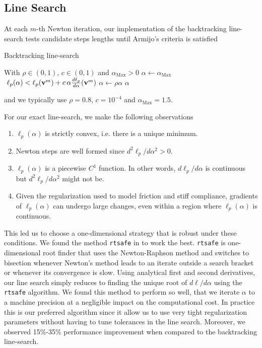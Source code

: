 \subsection{Line Search}
At each $m\text{-th}$ Newton iteration, our implementation of the backtracking
line-search tests candidate steps lengths until Armijo's criteria \cite[\S
3.1]{bib:nocedal2006numerical} is satisfied
\begin{algorithm}[H]
	\caption{Backtracking line-search}	
	\begin{algorithmic}
	\State With $\rho \in (0, 1)$, $c \in (0, 1)$ and $\alpha_\text{Max}>0$
	\State $\alpha\gets \alpha_\text{Max}$ 
	\RepeatUntil $~\ell_p(\alpha) <
	\ell_p({\mathbf{v}}^m) + c\,\alpha \frac{d\ell_p}{d\alpha}({\mathbf{v}}^m)$ \State
	$\alpha\gets \rho\alpha$
	\EndRepeatUntil
	\State\Return $\alpha$
\end{algorithmic}
\end{algorithm}	
and we typically use $\rho=0.8$, $c=10^{-4}$ and $\alpha_\text{Max}=1.5$.

For our exact line-search, we make the following observations
\begin{enumerate}
	\item $\ell_p(\alpha)$ is strictly convex, i.e. there is a unique minimum.
	\item Newton steps are well formed since $d^2\ell_p/d\alpha^2>0$.
	\item $\ell_p(\alpha)$ is a piecewise $C^1$ function. In other words,
	$d\ell_p/d\alpha$ is continuous but $d^2\ell_p/d\alpha^2$ might not be.	
	\item Given the regularization used to model friction and stiff compliance,
	gradients of $\ell_p(\alpha)$ can undergo large changes, even within a
	region where $\ell_p(\alpha)$ is continuous.
\end{enumerate}

This led us to choose a one-dimensional strategy that is robust under these
conditions. We found the method \verb;rtsafe; in \cite[\S
9.4]{bib:numerical_recipes} to work the best. \verb;rtsafe; is one-dimensional
root finder that uses the Newton-Raphson method and switches to bisection
whenever Newton's method leads to an iterate outside a search bracket or
whenever its convergence is slow. Using analytical first and second derivatives,
our line search simply reduces to finding the unique root of $d\ell/d\alpha$
using the \verb;rtsafe; algorithm. We found this method to perform so well, that
we iterate $\alpha$ to a machine precision at a negligible impact on the
computational cost. In practice this is our preferred algorithm since it allow
us to use very tight regularization parameters without having to tune tolerances
in the line search. Moreover, we observed 15\%-35\% performance improvement when
compared to the backtracking line-search.

